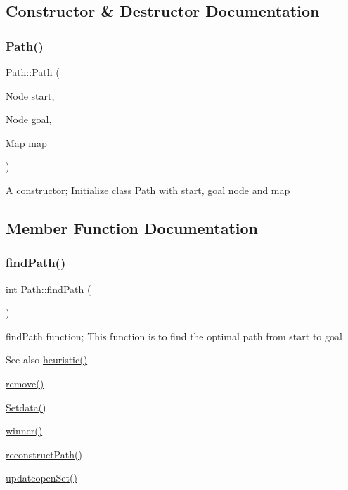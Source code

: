 \subsection{Constructor \& Destructor Documentation}
\mbox{\label{classPath_aa44674f9cfc08c9bcfa9dea22a32b613}} 
\subsubsection{\texorpdfstring{Path()}{Path()}}
{\footnotesize\ttfamily Path\+::\+Path (\begin{DoxyParamCaption}\item[{\hyperlink{classNode}{Node}}]{start,  }\item[{\hyperlink{classNode}{Node}}]{goal,  }\item[{\hyperlink{classMap}{Map}}]{map }\end{DoxyParamCaption})\hspace{0.3cm}{\ttfamily [inline]}}

A constructor; Initialize class \hyperlink{classPath}{Path} with start, goal node and map 

\subsection{Member Function Documentation}
\mbox{\label{classPath_a038e211ce369fa9b447a7dd674104166}} 
\subsubsection{\texorpdfstring{find\+Path()}{findPath()}}
{\footnotesize\ttfamily int Path\+::find\+Path (\begin{DoxyParamCaption}{ }\end{DoxyParamCaption})}

find\+Path function; This function is to find the optimal path from start to goal \begin{DoxySeeAlso}{See also}
\hyperlink{classPath_a41badb5baafeabe22b5c3dff132d25c6}{heuristic()} 

\hyperlink{classPath_a27e051fa22336b2b3fbac553dc16ea58}{remove()} 

\hyperlink{classPath_a46adcdba89032c765f282e74b998085f}{Setdata()} 

\hyperlink{classPath_a5ab3041f956a871aa5c8dd7b6f225f2b}{winner()} 

\hyperlink{classPath_aef81fce3aff1781467bbd0c620220c78}{reconstruct\+Path()} 

\hyperlink{classPath_a9de6800363177b6346a05ca55ccc2d05}{updateopen\+Set()} 
\end{DoxySeeAlso}
\mbox{\label{classPath_a41badb5baafeabe22b5c3dff132d25c6}} 
